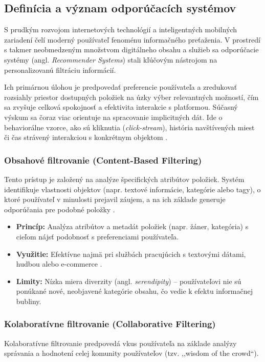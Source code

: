 
\subsection{Definícia a význam odporúčacích systémov}
S prudkým rozvojom internetových technológií a inteligentných mobilných zariadení čelí moderný používateľ fenoménu informačného preťaženia. V prostredí s takmer neobmedzeným množstvom digitálneho obsahu a služieb sa odporúčacie systémy (angl. \textit{Recommender Systems}) stali kľúčovým nástrojom na personalizovanú filtráciu informácií. 

Ich primárnou úlohou je predpovedať preferencie používateľa a 
zredukovať rozsiahly priestor dostupných položiek na úzky výber
relevantných možností, čím sa zvyšuje celková spokojnosť 
a efektivita interakcie s platformou. Súčasný výskum sa čoraz 
viac orientuje na spracovanie implicitných dát. Ide o
behaviorálne vzorce, ako sú kliknutia (\textit{click-stream}), 
história navštívených miest či čas strávený interakciou s 
konkrétnym objektom \cite{electronics11010141}.

\subsubsection{Obsahové filtrovanie (Content-Based Filtering)}
Tento prístup je založený na analýze špecifických atribútov položiek. Systém identifikuje vlastnosti objektov (napr. textové informácie, kategórie alebo tagy), o ktoré používateľ v minulosti prejavil záujem, a na ich základe generuje odporúčania pre podobné položky \cite{electronics11010141}.
\begin{itemize}
    \item \textbf{Princíp:} Analýza atribútov a metadát položiek (napr. žáner, kategória) s cieľom nájsť podobnosť s preferenciami používateľa.
    \item \textbf{Využitie:} Efektívne najmä pri službách pracujúcich s textovými dátami, hudbou alebo e-commerce \cite{electronics11010141}.
    \item \textbf{Limity:} Nízka miera diverzity (angl. \textit{serendipity}) – používateľovi nie sú ponúkané nové, neobjavené kategórie obsahu, čo vedie k efektu informačnej bubliny.
\end{itemize}

\subsubsection{Kolaboratívne filtrovanie (Collaborative Filtering)}
Kolaboratívne filtrovanie predpovedá vkus používateľa na základe analýzy správania a hodnotení celej komunity používateľov (tzv. ,,wisdom of the crowd``). 

